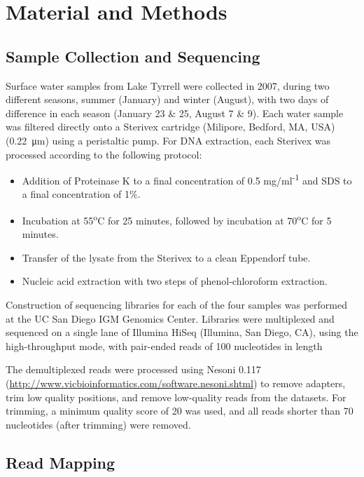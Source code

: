 

\section{Material and Methods}

\subsection{Sample Collection and Sequencing}
Surface water samples from Lake Tyrrell were collected in 2007, during two different seasons, summer (January) and winter (August), with two days of difference in each season (January 23 \& 25, August 7 \& 9). Each water sample was filtered directly onto a Sterivex cartridge (Milipore, Bedford, MA, USA) (\SI{0.22}{\micro\meter}) using a peristaltic pump. For DNA extraction, each Sterivex was processed according to the following protocol:

\begin{itemize}
\item Addition of Proteinase K to a final concentration of 0.5 mg/ml\textsuperscript{-1} and SDS to a final concentration of 1\%.
\item Incubation at 55\textsuperscript{o}C for 25 minutes, followed by incubation at 70\textsuperscript{o}C for 5 minutes.
\item Transfer of the lysate from the Sterivex to a clean Eppendorf tube.
\item Nucleic acid extraction with two steps of phenol-chloroform extraction. 
\end{itemize}

Construction of sequencing libraries for each of the four samples was performed at the UC San Diego IGM Genomics Center. Libraries were multiplexed and sequenced on a single lane of Illumina HiSeq (Illumina, San Diego, CA), using the high-throughput mode, with pair-ended reads of 100 nucleotides in length

The demultiplexed reads were processed using Nesoni 0.117 (\url{http://www.vicbioinformatics.com/software.nesoni.shtml}) to remove adapters, trim low quality positions, and remove low-quality reads from the datasets. For trimming, a minimum quality score of 20 was used, and all reads shorter than 70 nucleotides (after trimming) were removed.

\subsection{Read Mapping}

